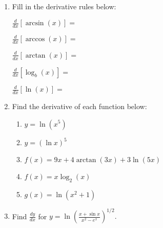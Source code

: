 \documentclass[11pt,fleqn]{article}
\begin{document}
\setlength{\parindent}{0cm}
\renewcommand{\headrulewidth}{0pt}
\newcommand{\blank}[1]{\rule{#1}{0.75pt}}
\renewcommand{\d}{\displaystyle}
\vspace*{-0.7in}
\begin{center}
 {\large{ }}
\end{center}
\begin{enumerate}
\item	Fill in the derivative rules below:\\
	\begin{multicols}{2}
	$\d{\frac{d}{dx}\left[\arcsin(x) \right]=}$\\
	\vspace{.15in}
	
	$\d{\frac{d}{dx}\left[\arccos(x) \right]=}$\\
	\vspace{.15in}
	
	$\d{\frac{d}{dx}\left[\arctan(x) \right]=}$\\
	\vspace{.15in}
	
	$\d{\frac{d}{dx}\left[\log_b(x) \right]=}$\\
	\vspace{.15in}
	
	$\d{\frac{d}{dx}\left[\ln(x) \right]=}$\\
	\vspace{.15in}
	\end{multicols}
	
\item Find the derivative of each function below:\\
	\begin{enumerate}
	\item $y=\ln(x^5)$
	\vfill
	\item $y=(\ln x )^5$
	\vfill 
	\item $f(x)=9x+4 \arctan(3x) + 3 \ln(5x)$\\
	\vfill
	\newpage
	\item $f(x)=x \log_2(x)$\\
	\vspace{1in}
	\item $g(x)=\ln(x^2+1)$\\
	\vspace{1in}
	\end{enumerate}
	\item Find $\frac{dy}{dx}$ for $y=\ln\left( \frac{x + \sin x}{x^2-e^x}\right)^{1/2}.$
\vfill
\end{enumerate}
\end{document}
